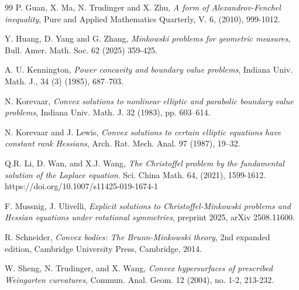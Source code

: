 \documentclass[12pt]{amsart}
\newcommand{\1}{\mathbf 1}
\begin{document}
\begin{thebibliography}{99}
 P. Guan, X. Ma, N. Trudinger and X. Zhu, {\it A form of Alexandrov-Fenchel inequality}, Pure and Applied Mathematics Quarterly, V. 6, (2010), 999-1012.

 Y. Huang, D. Yang and G. Zhang, {\em Minkowski problems for geometric measures}, Bull. Amer. Math. Soc. 62 (2025) 359-425.

 A. U. Kennington, {\it Power concavity and boundary value problems}, Indiana Univ. Math. J., 34 (3) (1985), 687--703.

 N. Korevaar, {\it Convex solutions to nonlinear elliptic and parabolic boundary value problems}, Indiana Univ. Math. J. 32 (1983), pp. 603--614.

 N. Korevaar and J. Lewis, {\it Convex solutions to certain elliptic equations have constant rank Hessians}, Arch. Rat. Mech. Anal. 97 (1987), 19--32.

 Q.R. Li, D. Wan, and X.J. Wang, {\em The Christoffel problem by the fundamental solution of the Laplace equation}. Sci. China Math. 64,  (2021), 1599-1612. https://doi.org/10.1007/s11425-019-1674-1

 F. Mussnig, J. Ulivelli, {\it Explicit solutions to Christoffel-Minkowski problems and Hessian equations under rotational symmetries}, preprint 2025, arXiv 2508.11600.

 R. Schneider, {\em Convex bodies: The Brunn-Minkowski theory}, 2nd expanded edition, Cambridge University Press, Cambridge, 2014.

 W. Sheng, N. Trudinger, and X. Wang, {\em Convex hypersurfaces
of prescribed Weingarten curvatures}, Commun. Anal. Geom. 12 (2004),
no. 1-2, 213-232.
\end{thebibliography}
\end{document}

